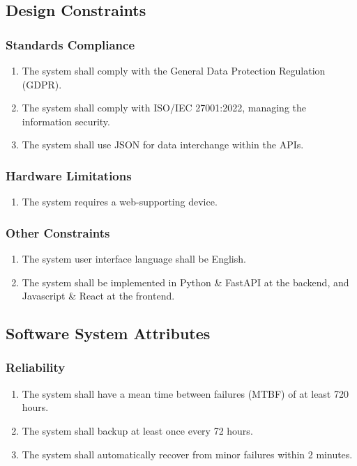 \subsection{Design Constraints}
\subsubsection{Standards Compliance}
\begin{enumerate}[resume]
    \item The system shall comply with the General Data Protection Regulation (GDPR).
    \item The system shall comply with ISO/IEC 27001:2022, managing the information security.
    \item The system shall use JSON for data interchange within the APIs.
\end{enumerate}
 

\subsubsection{Hardware Limitations}
\begin{enumerate}[resume]
    \item The system requires a web-supporting device.
\end{enumerate}
 

\subsubsection{Other Constraints}
\begin{enumerate}[resume]
    \item The system user interface language shall be English.
    \item The system shall be implemented in Python \& FastAPI at the backend, and Javascript \& React at the frontend.
\end{enumerate}



\subsection{Software System Attributes}
\subsubsection{Reliability}
\begin{enumerate}[resume]
    \item The system shall have a mean time between failures (MTBF) of at least 720 hours.
    \item The system shall backup at least once every 72 hours.
    \item The system shall automatically recover from minor failures within 2 minutes.
\end{enumerate}

